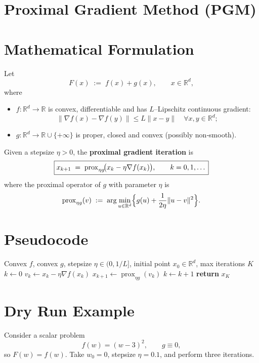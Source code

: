\documentclass{article}
\newcommand{\prox}{\operatorname{prox}}
\newcommand{\R}{\mathbb{R}}
\begin{document}
\section*{Proximal Gradient Method (PGM)}

\section*{Mathematical Formulation}
Let 
\[
F(x)\;:=\;f(x)+g(x),\qquad x\in\R^{d},
\]
where  

\begin{itemize}
    \item $f:\R^{d}\to\R$ is convex, differentiable and has $L$–Lipschitz continuous gradient:
    \[
    \|\nabla f(x)-\nabla f(y)\|\le L\|x-y\|\quad\forall x,y\in\R^{d};
    \]
    \item $g:\R^{d}\to\R\cup\{+\infty\}$ is proper, closed and convex (possibly non‑smooth).
\end{itemize}
Given a stepsize $\eta>0$, the \textbf{proximal gradient iteration} is
\begin{equation}
\boxed{%
x_{k+1}\;=\;\prox_{\eta g}\!\bigl(x_{k}-\eta\nabla f(x_{k})\bigr),\qquad k=0,1,\dots
}
\label{eq:update}
\end{equation}
where the proximal operator of $g$ with parameter $\eta$ is
\[
\prox_{\eta g}(v)\;:=\;\arg\min_{u\in\R^{d}}\Bigl\{ g(u)+\frac{1}{2\eta}\|u-v\|^{2}\Bigr\}.
\]

\section*{Pseudocode}
\begin{algorithm}[H]
\caption{Proximal Gradient Method}
\begin{algorithmic}[1]
\Require Convex $f$, convex $g$, stepsize $\eta\in(0,1/L]$, initial point $x_{0}\in\R^{d}$, max iterations $K$
\State $k\gets 0$
    \State $v_{k}\gets x_{k}-\eta\nabla f(x_{k})$ 
    \State $x_{k+1}\gets \prox_{\eta g}(v_{k})$ 
    \State $k\gets k+1$
\EndWhile
\State \textbf{return} $x_{K}$
\end{algorithmic}
\end{algorithm}

\section*{Dry Run Example}
Consider a scalar problem  
\[
f(w)= (w-3)^{2},\qquad g\equiv 0,
\]
so $F(w)=f(w)$.  
Take $w_{0}=0$, stepsize $\eta=0.1$, and perform three iterations.
\end{document}
